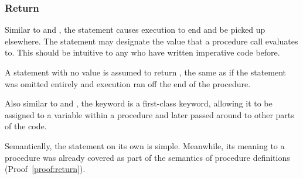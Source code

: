 \subsubsection{Return}

Similar to  and , the  statement causes execution
to end and be picked up elsewhere. The  statement may designate the value
that a procedure call evaluates to. This should be intuitive to any who have written
imperative code before.

A  statement with no value is assumed to return , the same as if
the  statement was omitted entirely and execution ran off the end of the
procedure.

Also similar to  and , the  keyword is a first-class
keyword, allowing it to be assigned to a variable within a procedure and later passed
around to other parts of the code.

\begin{bnf*}
\end{bnf*}

Semantically, the  statement on its own is simple. Meanwhile, its meaning
to a procedure was already covered as part of the semantics of procedure definitions
(Proof~\ref{proof:return}).

\begin{prooftree}
\end{prooftree}
